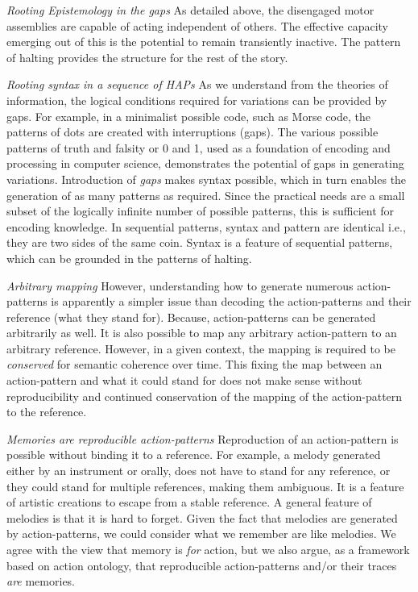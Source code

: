 \emph{Rooting Epistemology in the gaps} As detailed above, the disengaged motor assemblies are capable of acting independent of others. The effective capacity emerging out of this is the potential to remain transiently inactive. The pattern of halting provides the structure for the rest of the story. 

\emph{Rooting syntax in a sequence of HAPs} As we understand from the theories of information, the logical conditions required for variations can be provided by gaps. For example, in a minimalist possible code, such as Morse code, the patterns of dots are created with interruptions (gaps). The various possible patterns of truth and falsity or 0 and 1, used as a foundation of encoding and processing in computer science, demonstrates the potential of gaps in generating variations. Introduction of \textit{gaps} makes syntax possible, which in turn enables the generation of as many patterns as required. Since the practical needs are a small subset of the logically infinite number of possible patterns, this is sufficient for encoding knowledge. In sequential patterns, syntax and pattern are identical i.e., they are two sides of the same coin. Syntax is a feature of sequential patterns, which can be grounded in the patterns of halting. 

\emph{Arbitrary mapping} However, understanding how to generate numerous action-patterns is apparently a simpler issue than decoding the action-patterns and their reference (what they stand for). Because, action-patterns can be generated arbitrarily as well. It is also possible to map any arbitrary action-pattern to an arbitrary reference. However, in a given context, the mapping is required to be \textit{conserved} for semantic coherence over time. This fixing the map between an action-pattern and what it could stand for does not make sense without reproducibility and continued conservation of the mapping of the action-pattern to the reference. 

\emph{Memories are reproducible action-patterns} Reproduction of an action-pattern is possible without binding it to a reference. For example, a melody generated either by an instrument or orally, does not have to stand for any reference, or they could stand for multiple references, making them ambiguous. It is a feature of artistic creations to escape from a stable reference. A general feature of melodies is that it is hard to forget. Given the fact that melodies are generated by action-patterns, we could consider what we remember are like melodies. We agree with the view that memory is \textit{for} action\cite{glenberg1997memory}, but we also argue, as a framework based on action ontology, that reproducible action-patterns and/or their traces \textit{are} memories. 

